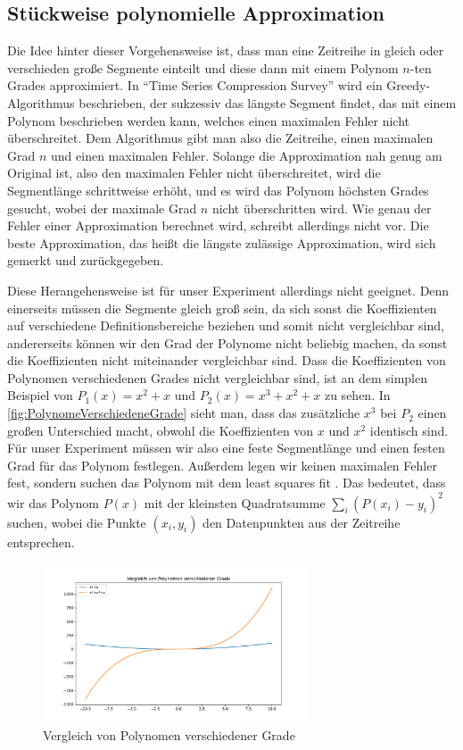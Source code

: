 \subsection{Stückweise polynomielle Approximation}\label{subsec:ppa}
Die Idee hinter dieser Vorgehensweise ist, dass man eine Zeitreihe in gleich oder verschieden große Segmente einteilt und diese dann mit einem Polynom $n$-ten Grades approximiert. In "`Time Series Compression Survey"' \cite[Ch. 4.2.1]{compressionSurvey} wird ein Greedy-Algorithmus beschrieben, der sukzessiv das längste Segment findet, das mit einem Polynom beschrieben werden kann, welches einen maximalen Fehler nicht überschreitet. Dem Algorithmus gibt man also die Zeitreihe, einen maximalen Grad $n$ und einen maximalen Fehler. Solange die Approximation nah genug am Original ist, also den maximalen Fehler nicht überschreitet, wird die Segmentlänge schrittweise erhöht, und es wird das Polynom höchsten Grades gesucht, wobei der maximale Grad $n$ nicht überschritten wird. Wie genau der Fehler einer Approximation berechnet wird, schreibt \cite[Algorithm 4]{compressionSurvey} allerdings nicht vor. Die beste Approximation, das heißt die längste zulässige Approximation, wird sich gemerkt und zurückgegeben.

Diese Herangehensweise ist für unser Experiment allerdings nicht geeignet. Denn einerseits müssen die Segmente gleich groß sein, da sich sonst die Koeffizienten auf verschiedene Definitionsbereiche beziehen und somit nicht vergleichbar sind, andererseits können wir den Grad der Polynome nicht beliebig machen, da sonst die Koeffizienten nicht miteinander vergleichbar sind. Dass die Koeffizienten von Polynomen verschiedenen Grades nicht vergleichbar sind, ist an dem simplen Beispiel von $P_1(x)=x^2+x$ und $P_2(x)=x^3+x^2+x$ zu sehen. In \autoref{fig:PolynomeVerschiedeneGrade} sieht man, dass das zusätzliche $x^3$ bei $P_2$ einen großen Unterschied macht, obwohl die Koeffizienten von $x$ und $x^2$ identisch sind. Für unser Experiment müssen wir also eine feste Segmentlänge und einen festen Grad für das Polynom festlegen. Außerdem legen wir keinen maximalen Fehler fest, sondern suchen das Polynom mit dem least squares fit \cite{leastSquares}. Das bedeutet, dass wir das Polynom $P(x)$ mit der kleinsten Quadratsumme $\sum_i (P(x_i)-y_i)^2$ suchen, wobei die Punkte $(x_i,y_i)$ den Datenpunkten aus der Zeitreihe entsprechen.
\begin{figure}[bth] 
  \centering
  \includegraphics[width=0.7\textwidth]{Graphics/ComparissonDifferentPolDegrees.pdf}
  \caption{Vergleich von Polynomen verschiedener Grade}
  \label{fig:PolynomeVerschiedeneGrade}
\end{figure}

